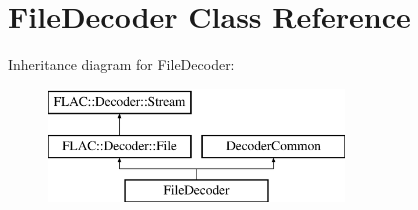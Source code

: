 \hypertarget{class_file_decoder}{}\section{File\+Decoder Class Reference}
\label{class_file_decoder}
Inheritance diagram for File\+Decoder\+:\begin{figure}[H]
\begin{center}
\leavevmode
\includegraphics[height=3.000000cm]{class_file_decoder}
\end{center}
\end{figure}
